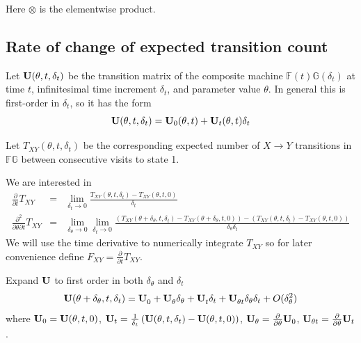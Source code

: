 \documentclass{article}
\begin{document}
Here $\otimes$ is the elementwise product.

\subsection{Rate of change of expected transition count}

Let ${\bf U}(\theta,t,\delta_t)$ be the transition matrix
of the composite machine $\mathbb{F}(t)\mathbb{G}(\delta_t)$
at time $t$, infinitesimal time increment $\delta_t$, and parameter value $\theta$.
In general this is first-order in $\delta_t$, so it has the form
\[
  {\bf U}(\theta,t,\delta_t) = {\bf U}_0(\theta,t) + {\bf U}_t(\theta,t) \delta_t
  \]

  
  Let $T_{XY}(\theta,t,\delta_t)$ be the corresponding expected number of $X \to Y$ transitions in $\mathbb{FG}$
  between consecutive visits to state 1.

We are interested in
\begin{eqnarray*}
\frac{\partial}{\partial t}T_{XY} & = & \lim_{\delta_t \to 0} \frac{T_{XY}(\theta,t,\delta_t) - T_{XY}(\theta,t,0)}{\delta_t} \\
\frac{\partial^2}{\partial \theta \partial t}T_{XY} & = & \lim_{\delta_\theta \to 0} \lim_{\delta_t \to 0}
\frac{\left(T_{XY}(\theta+\delta_\theta,t,\delta_t) - T_{XY}(\theta+\delta_\theta,t,0)\right) - \left(T_{XY}(\theta,t,\delta_t) - T_{XY}(\theta,t,0)\right)}{\delta_\theta \delta_t}
\end{eqnarray*}
We will use the time derivative to numerically integrate $T_{XY}$ so for later convenience define $F_{XY} = \frac{\partial}{\partial t} T_{XY}$.

Expand ${\bf U}$ to first order in both $\delta_\theta$ and $\delta_t$
\newcommand\tthetaexpansion[2]{  {#2}_0^{#1}
  + {#2}_\theta^{#1} \delta_\theta
  + {#2}_t^{#1} \delta_t
  + {#2}_{\theta t}^{#1} \delta_\theta \delta_t }
\newcommand\uexpansion{\tthetaexpansion{}{\bf U}}
\newcommand\vexpansion[1]{\tthetaexpansion{#1}{\bf V}}
\[
  {\bf U}(\theta+\delta_\theta,t,\delta_t) = \uexpansion + O(\delta_\theta^2) %
\]
where ${\bf U}_0={\bf U}(\theta,t,0)$,
${\bf U}_t=\frac{1}{\delta_t} \left( {\bf U}(\theta,t,\delta_t) - {\bf U}(\theta,t,0) \right)$,
${\bf U}_\theta=\frac{\partial}{\partial \theta} {\bf U}_0$,
${\bf U}_{\theta t}=\frac{\partial}{\partial \theta}  {\bf U}_t$.
\end{document}
